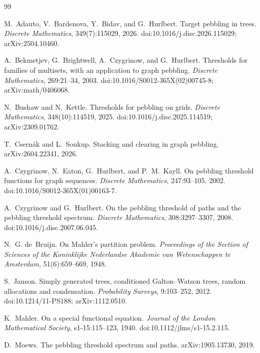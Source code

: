\documentclass[11pt]{article}
\begin{document}
\begin{thebibliography}{99}

M.~Adauto, V.~Bardenova, Y.~Bidav, and G.~Hurlbert.
\newblock Target pebbling in trees.
\newblock \emph{Discrete Mathematics}, 349(7):115029, 2026.
\newblock doi:10.1016/j.disc.2026.115029; arXiv:2504.10460.

A.~Bekmetjev, G.~Brightwell, A.~Czygrinow, and G.~Hurlbert.
\newblock Thresholds for families of multisets, with an application to graph pebbling.
\newblock \emph{Discrete Mathematics}, 269:21--34, 2003.
\newblock doi:10.1016/S0012-365X(02)00745-8; arXiv:math/0406068.

N.~Bushaw and N.~Kettle.
\newblock Thresholds for pebbling on grids.
\newblock \emph{Discrete Mathematics}, 348(10):114519, 2025.
\newblock doi:10.1016/j.disc.2025.114519; arXiv:2309.01762.

T.~Csern\'ak and L.~Soukup.
\newblock Stacking and clearing in graph pebbling.
\newblock arXiv:2604.22341, 2026.

A.~Czygrinow, N.~Eaton, G.~Hurlbert, and P.~M.~Kayll.
\newblock On pebbling threshold functions for graph sequences.
\newblock \emph{Discrete Mathematics}, 247:93--105, 2002.
\newblock doi:10.1016/S0012-365X(01)00163-7.

A.~Czygrinow and G.~Hurlbert.
\newblock On the pebbling threshold of paths and the pebbling threshold spectrum.
\newblock \emph{Discrete Mathematics}, 308:3297--3307, 2008.
\newblock doi:10.1016/j.disc.2007.06.045.

N.~G. de~Bruijn.
\newblock On Mahler's partition problem.
\newblock \emph{Proceedings of the Section of Sciences of the Koninklijke
Nederlandse Akademie van Wetenschappen te Amsterdam}, 51(6):659--669, 1948.

S.~Janson.
\newblock Simply generated trees, conditioned Galton--Watson trees, random allocations and condensation.
\newblock \emph{Probability Surveys}, 9:103--252, 2012.
\newblock doi:10.1214/11-PS188; arXiv:1112.0510.

K.~Mahler.
\newblock On a special functional equation.
\newblock \emph{Journal of the London Mathematical Society}, s1-15:115--123, 1940.
\newblock doi:10.1112/jlms/s1-15.2.115.

D.~Moews.
\newblock The pebbling threshold spectrum and paths.
\newblock arXiv:1905.13730, 2019.


\end{thebibliography}
\end{document}
